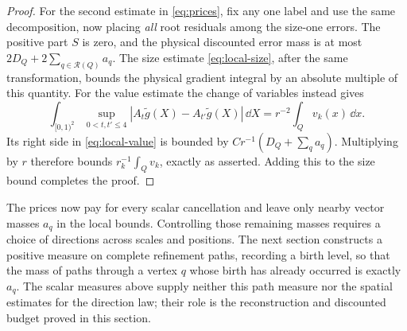 \begin{proof}
For the second estimate in \eqref{eq:prices}, fix any one label
and use the same decomposition, now placing \emph{all} root
residuals among the size-one errors. The positive part $S$
is zero, and the physical discounted error mass is at most
$2D_Q+2\sum_{q\in\mathcal R(Q)}a_q$. The size estimate
\eqref{eq:local-size}, after the same transformation, bounds
the physical gradient integral by an absolute multiple of
this quantity. For the value estimate the change of variables
instead gives
\begin{equation}\label{eq:prices-value-scaling}
 \int_{[0,1)^2}\sup_{0<t,t'\le4}
       |A_t\widetilde g(X)-A_{t'}\widetilde g(X)|\,\dd X
   =r^{-2}\int_Qv_k(x)\,\dd x.
\end{equation}
Its right side in \eqref{eq:local-value} is bounded by
$Cr^{-1}(D_Q+\sum_q a_q)$. Multiplying by $r$ therefore
bounds $r_k^{-1}\int_Qv_k$, exactly as asserted. Adding this
to the size bound completes the proof.
\end{proof}

The prices now pay for every scalar cancellation and leave only
nearby vector masses $a_q$ in the local bounds. Controlling those
remaining masses requires a choice of directions across scales
and positions. The next section constructs a positive measure on
complete refinement paths, recording a birth level, so that the mass
of paths through a vertex $q$ whose birth has already occurred is
exactly $a_q$. The scalar measures above supply neither this path
measure nor the spatial estimates for the direction law; their role
is the reconstruction and discounted budget proved in this section.
